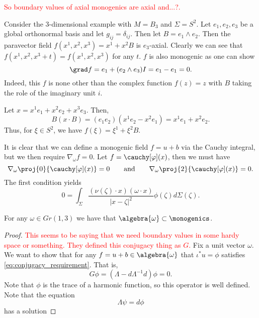 \documentclass[12pt]{article}
\begin{document}
\textcolor{red}{So boundary values of axial monogenics are axial and...?.}

\begin{example}
    Consider the 3-dimensional example with $M=B_3$ and $\Sigma=S^2$.  Let $e_1,e_2,e_3$ be a global orthonormal basis and let $g_{ij}=\delta_{ij}$.  Then let $B=e_1 \wedge e_2$.  Then the paravector field $f(x^1,x^2,x^3)=x^1+x^2B$ is $e_3$-axial. Clearly we can see that $f(x^1,x^2,x^3+t)=f(x^1,x^2,x^3)$ for any $t$.  $f$ is also monogenic as one can show
    \[
        \grad f = e_1 + (e_2 \wedge e_3)I = e_1 - e_1 = 0.
    \]
    Indeed, this $f$ is none other than the complex function $f(z)=z$ with $B$ taking the role of the imaginary unit $i$. 

    Let $x=x^1e_1 + x^2e_2 + x^3e_3$.  Then, 
    \[
        B (x\cdot B) = (e_1e_2)( x^1e_2 -x^2 e_1 ) = x^1 e_1 + x^2 e_2.
    \] 
    Thus, for $\xi \in S^2$, we have $f(\xi)=\xi^1 +\xi^2 B$.
\end{example}


It is clear that we can define a monogenic field $f=u+b$ via the Cauchy integral, but we then require $\nabla_\omega f = 0$.  Let $f=\cauchy[\varphi](x)$, then we must have
\[
\nabla_\omega \proj{0}{\cauchy[\varphi](x)} = 0 \qquad \textrm{and} \qquad \nabla_\omega \proj{2}{\cauchy[\varphi](x)}=0.
\]
The first condition yields
\[
0 = \int_\Sigma \frac{(\nu(\zeta)\cdot x) (\omega \cdot x)}{|x-\zeta|^2} \phi(\zeta) d\Sigma(\zeta).
\]


\begin{theorem}
    For any $\omega \in Gr(1,3)$ we have that $\algebra{\omega}\subset \monogenics$. 
\end{theorem}
\begin{proof}
    \textcolor{red}{This seems to be saying that we need boundary values in some hardy space or something. They defined this conjugacy thing as $G$.}
    Fix a unit vector $\omega$.  We want to show that for any $f=u+b\in \algebra{\omega}$ that $\iota^* u=\phi$ satisfies \ref{eq:conjugacy_requirement}.  That is,
    \[
        G\phi = (\Lambda - d\Lambda^{-1}d) \phi = 0.
    \]
    Note that $\phi$ is the trace of a harmonic function, so this operator is well defined.  Note that the equation
    \[
        \Lambda \psi = d \phi
    \]
    has a solution
\end{proof}
\end{document}

